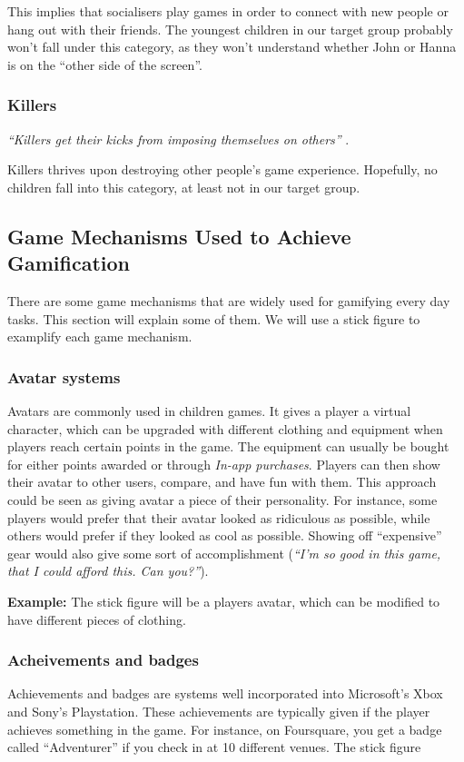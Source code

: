 This implies that socialisers play games in order to connect with new people or hang out with their friends. The youngest children in our target group probably won't fall under this category, as they won't understand whether John or Hanna is on the ``other side of the screen''.    

\subsubsection{Killers}
\textit{``Killers get their kicks from imposing themselves on others''} \cite{bartle-gamers}.

Killers thrives upon destroying other people's game experience. Hopefully, no children fall into this category, at least not in our target group.  

\subsection{Game Mechanisms Used to Achieve Gamification} 

There are some game mechanisms that are widely used for gamifying every day tasks. This section will explain some of them. We will use a stick figure to examplify each game mechanism. 

\subsubsection{Avatar systems}
Avatars are commonly used in children games. It gives a player a virtual character, which can be upgraded with different clothing and equipment when players reach certain points in the game. The equipment can usually be bought for either points awarded or through \emph{In-app purchases}. Players can then show their avatar to other users, compare, and have fun with them. This approach could be seen as giving avatar a piece of their personality. For instance, some players would prefer that their avatar looked as ridiculous as possible, while others would prefer if they looked as cool as possible. Showing off ``expensive'' gear would also give some sort of accomplishment (\emph{``I'm so good in this game, that I could afford this. Can you?''}). 

\textbf{Example:} The stick figure will be a players avatar, which can be modified to have different pieces of clothing.  

\subsubsection{Acheivements and badges}
Achievements and badges are systems well incorporated into Microsoft's Xbox and Sony's Playstation. These achievements are typically given if the player achieves something in the game. For instance, on Foursquare, you get a badge called ``Adventurer'' if you check in at 10 different venues. The stick figure

